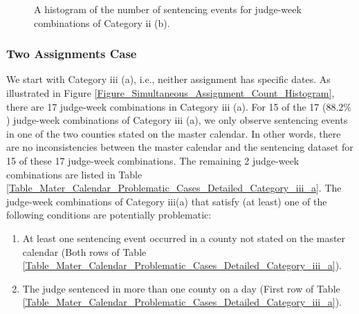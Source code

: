 \documentclass[11pt, oneside]{article}   	%
\theoremstyle{ModifiedStyle}
\begin{document}
\begin{figure}[H]
\begin{minipage}{0.45\textwidth}
		\vspace{-6mm}
		\caption{A histogram of the number of sentencing events for judge-week combinations of Category ii (b).}
		\label{Figure_Histogram_of_Sentences_This_Week_Category_11}
	\end{minipage}
\end{figure}

\subsubsection{Two Assignments Case}
\label{Sec:Master_Calendar:Further_Analysis_of_Some_Assignments:Category_iii}
We start with Category iii (a), i.e., neither assignment has specific dates. As illustrated in Figure \ref{Figure_Simultaneous_Assignment_Count_Histogram}, there are 17 judge-week combinations in Category iii (a). For 15 of the 17 ($88.2\%$) judge-week combinations of Category iii (a), we only observe sentencing events in one of the two counties stated on the master calendar. In other words, there are no inconsistencies between the master calendar and the sentencing dataset for 15 of these 17 judge-week combinations. The remaining 2 judge-week combinations are listed in Table \ref{Table_Mater_Calendar_Problematic_Cases_Detailed_Category_iii_a}. The judge-week combinations of Category iii(a) that satisfy (at least) one of the following conditions are potentially problematic:
\begin{enumerate}
	\vspace{-3mm}
	\item At least one sentencing event occurred in a county not stated on the master calendar (Both rows of Table \ref{Table_Mater_Calendar_Problematic_Cases_Detailed_Category_iii_a}).
	\vspace{-2mm}
	\item The judge sentenced in more than one county on a day (First row of Table \ref{Table_Mater_Calendar_Problematic_Cases_Detailed_Category_iii_a}).
\end{enumerate}
\end{document}

